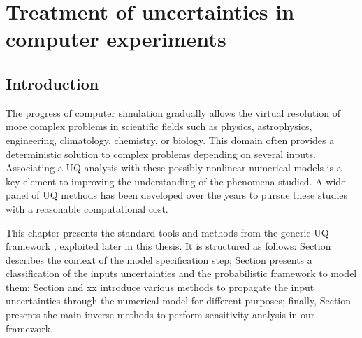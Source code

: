 \chapter{Treatment of uncertainties in computer experiments}
\hfill
\localtableofcontents
\newpage

\section{Introduction}\label{sec:}

The progress of computer simulation gradually allows the virtual resolution of more complex problems in scientific fields such as physics, astrophysics, engineering, climatology, chemistry, or biology.
This domain often provides a deterministic solution to complex problems depending on several inputs. 
Associating a UQ analysis with these possibly nonlinear numerical models is a key element to improving the understanding of the phenomena studied. 
A wide panel of UQ methods has been developed over the years to pursue these studies with a reasonable computational cost. 

This chapter presents the standard tools and methods from the generic UQ framework , exploited later in this thesis. 
It is structured as follows: Section  describes the context of the model specification step; 
Section  presents a classification of the inputs uncertainties and the probabilistic framework to model them; 
Section  and xx introduce various methods to propagate the input uncertainties through the numerical model for different purposes;
finally, Section  presents the main inverse methods to perform sensitivity analysis in our framework.


